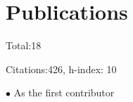 \documentclass[letterpaper]{moderncv}
\begin{document}

\newpage
\section{Publications}







Total:18

Citations:426,
h-index: 10

\textbf{$\bullet$} As the first contributor
\end{document}
